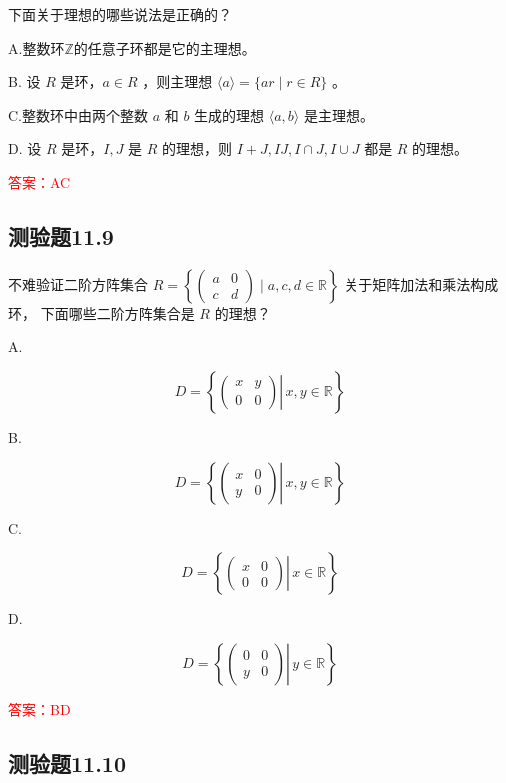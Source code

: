 \documentclass[UTF8, heading=true]{ctexart}
\begin{document}
下面关于理想的哪些说法是正确的？

A.整数环$\mathbb{Z}$的任意子环都是它的主理想。

B.
设 $R$ 是环，$a \in R$ ，则主理想 $\langle a\rangle=\{a r \mid r \in R\}$ 。

C.整数环中由两个整数 $a$ 和 $b$ 生成的理想 $\langle a, b\rangle$ 是主理想。

D.
设 $R$ 是环，$I, J$ 是 $R$ 的理想，则 $I+J, I J, I \cap J, I \cup J$ 都是 $R$ 的理想。

\textcolor{red}{答案：AC}

\subsection{测验题11.9}

不难验证二阶方阵集合 $R=
\left\{\left(\begin{array}{ll}a & 0 \\ c & d\end{array}\right)
\mid a, c, d \in \mathbb{R}\right\}$
关于矩阵加法和乘法构成环，
下面哪些二阶方阵集合是 $R$ 的理想？

A.

$$
D=\left\{\left.\left(\begin{array}{ll}
x & y \\
0 & 0
\end{array}\right) \right\rvert\, x, y \in \mathbb{R}\right\}
$$


B.

$$
D=\left\{\left.\left(\begin{array}{ll}
x & 0 \\
y & 0
\end{array}\right) \right\rvert\, x, y \in \mathbb{R}\right\}
$$


C.

$$
D=\left\{\left.\left(\begin{array}{ll}
x & 0 \\
0 & 0
\end{array}\right) \right\rvert\, x \in \mathbb{R}\right\}
$$


D.

$$
D=\left\{\left.\left(\begin{array}{ll}
0 & 0 \\
y & 0
\end{array}\right) \right\rvert\, y \in \mathbb{R}\right\}
$$

\textcolor{red}{答案：BD}

\subsection{测验题11.10}
\end{document}
